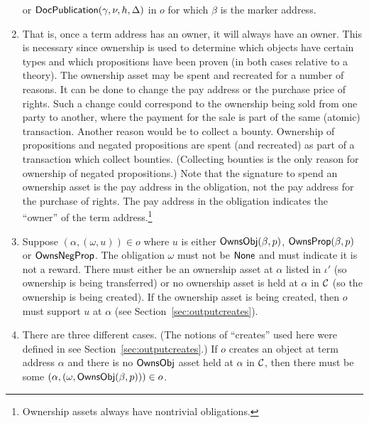 \begin{enumerate}
or
${\constr{DocPublication}}(\gamma,\nu,h,\Delta)$
in $o$
for which $\beta$ is the marker address.
\item {}
That is, once a term address has an owner, it will always have an owner.
This is necessary since ownership is used to determine which objects have certain types and which propositions
have been proven (in both cases relative to a theory).
The ownership asset may be spent and recreated for a number of reasons.
It can be done to change the pay address or the purchase price of rights.
Such a change could correspond to the ownership being sold from one party to another,
where the payment for the sale is part of the same (atomic) transaction.
Another reason would be to collect a bounty.
Ownership of propositions and negated propositions are spent (and recreated) as part of
a transaction which collect bounties.
(Collecting bounties is the only reason for ownership of negated propositions.)
Note that the signature to spend an ownership asset is the pay address in the obligation,
not the pay address for the purchase of rights.
The pay address in the obligation indicates the ``owner'' of the term address.\footnote{Ownership assets always have nontrivial obligations.}
\item {}
Suppose $(\alpha,(\omega,u))\in o$ where $u$ is either ${\constr{OwnsObj}}(\beta,p)$,
${\constr{OwnsProp}}(\beta,p)$ or ${\constr{OwnsNegProp}}$.
The obligation $\omega$ must not be $\val{None}$ and must indicate it is not a reward.
There must either be an ownership asset at $\alpha$ listed in $\iota'$ (so ownership is being transferred)
or no ownership asset is held at $\alpha$ in $\mathcal{C}$ (so the ownership is being created).
If the ownership asset is being created, then $o$ must support $u$ at $\alpha$ (see Section~\ref{sec:outputcreates}).
\item {}
There are three different cases.
(The notions of ``creates'' used here were defined in see Section~\ref{sec:outputcreates}.)
If $o$ creates an object at term address $\alpha$
and there is no ${\constr{OwnsObj}}$ asset held at $\alpha$ in $\mathcal{C}$,
then there must be some
$(\alpha,(\omega,{\constr{OwnsObj}}(\beta,p)))\in o$.

\end{enumerate}
